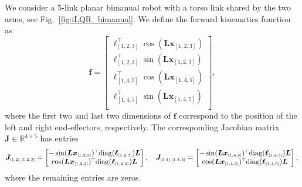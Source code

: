 \documentclass[10pt,a4paper]{article} %
\newcommand{\trsp}{{\scriptscriptstyle\top}}
\newcommand{\ty}[1]{{\scriptscriptstyle{#1}}}
\newcommand{\diag}{\mathrm{diag}}
\begin{document}
We consider a 5-link planar bimanual robot with a torso link shared by the two arms, see Fig.~\ref{fig:iLQR_bimanual}. We define the forward kinematics function as
\begin{equation*}
	\bm{f} = \begin{bmatrix} 
	\bm{\ell}_\ty{[1,2,3]}^\trsp \cos(\bm{L}\bm{x}_\ty{[1,2,3]}) \\ 
	\bm{\ell}_\ty{[1,2,3]}^\trsp \sin(\bm{L}\bm{x}_\ty{[1,2,3]}) \\
	\bm{\ell}_\ty{[1,4,5]}^\trsp \cos(\bm{L}\bm{x}_\ty{[1,4,5]}) \\ 
	\bm{\ell}_\ty{[1,4,5]}^\trsp \sin(\bm{L}\bm{x}_\ty{[1,4,5]}) \\
	\end{bmatrix} \!\!,
\end{equation*}
where the first two and last two dimensions of $\bm{f}$ correspond to the position of the left and right end-effectors, respectively. The corresponding Jacobian matrix $\bm{J}\in\mathbb{R}^{4\times 5}$ has entries
\begin{equation*}
	\bm{J}_\ty{[1,2],[1,2,3]} = \begin{bmatrix} 
	-\sin(\bm{L}\bm{x}_\ty{[1,2,3]})^\trsp \diag(\bm{\ell}_\ty{[1,2,3]}) \bm{L} \\ 
	 \cos(\bm{L}\bm{x}_\ty{[1,2,3]})^\trsp \diag(\bm{\ell}_\ty{[1,2,3]}) \bm{L} 
	\end{bmatrix},\quad
	\bm{J}_\ty{[3,4],[1,4,5]} = \begin{bmatrix} 
	-\sin(\bm{L}\bm{x}_\ty{[1,4,5]})^\trsp \diag(\bm{\ell}_\ty{[1,4,5]}) \bm{L} \\ 
	 \cos(\bm{L}\bm{x}_\ty{[1,4,5]})^\trsp \diag(\bm{\ell}_\ty{[1,4,5]}) \bm{L} 
	\end{bmatrix},\\
\end{equation*}
where the remaining entries are zeros.
\end{document}
